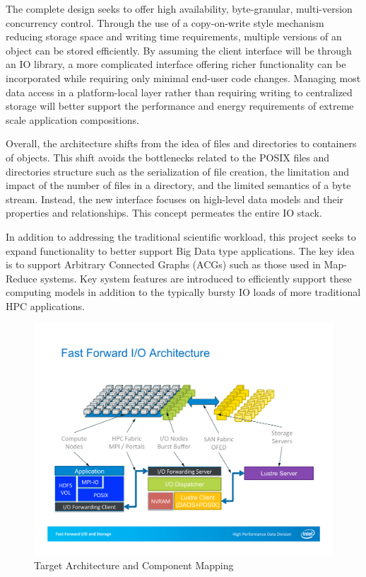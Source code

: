 \documentclass[conference]{IEEEtran} \pdfpagewidth=8.5in
\begin{document}
The complete design seeks to offer high availability, byte-granular,
multi-version concurrency control. Through the use of a copy-on-write style
mechanism reducing storage space and writing time requirements, multiple
versions of an object can be stored efficiently. By assuming the client
interface will be through an IO library, a more complicated interface offering
richer functionality can be incorporated while requiring only minimal end-user
code changes.  Managing most data access in a platform-local layer rather than
requiring writing to centralized storage will better support the performance
and energy requirements of extreme scale application compositions.

Overall, the architecture shifts from the idea of files and directories to
containers of objects. This shift avoids the bottlenecks related to the POSIX
files and directories structure such as the serialization of file creation, the
limitation and impact of the number of files in a directory, and the limited
semantics of a byte stream. Instead, the new interface focuses on high-level
data models and their properties and relationships. This concept permeates the
entire IO stack.

In addition to addressing the traditional scientific workload, this project
seeks to expand functionality to better support Big Data type applications. The
key idea is to support Arbitrary Connected Graphs (ACGs) such as those used in
Map-Reduce systems. Key system features are introduced to efficiently support
these computing models in addition to the typically bursty IO loads of more
traditional HPC applications.

\begin{figure}[htbp]
\centering
\includegraphics[width=\columnwidth]{images/arch-mapping}
\caption{Target Architecture and Component Mapping}
\label{fig:arch-mapping}
\end{figure}
\end{document}
